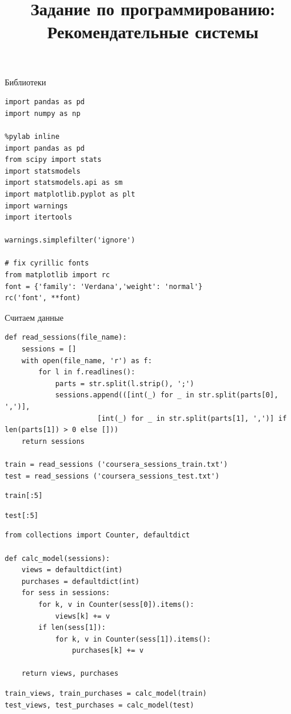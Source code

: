 \documentclass[11pt,a4paper]{article}
\title{Задание по программированию: Рекомендательные системы}
\begin{document}
\maketitle

Библиотеки

\begin{verbatim}
import pandas as pd
import numpy as np

%pylab inline
import pandas as pd
from scipy import stats
import statsmodels
import statsmodels.api as sm
import matplotlib.pyplot as plt
import warnings
import itertools

warnings.simplefilter('ignore')

# fix cyrillic fonts
from matplotlib import rc
font = {'family': 'Verdana','weight': 'normal'}
rc('font', **font)
\end{verbatim}

Считаем данные

\begin{verbatim}
def read_sessions(file_name):
    sessions = []
    with open(file_name, 'r') as f:
        for l in f.readlines():
            parts = str.split(l.strip(), ';')
            sessions.append(([int(_) for _ in str.split(parts[0], ',')], 
                      [int(_) for _ in str.split(parts[1], ',')] if len(parts[1]) > 0 else []))
    return sessions

train = read_sessions ('coursera_sessions_train.txt')
test = read_sessions ('coursera_sessions_test.txt')
\end{verbatim}

\begin{verbatim}
train[:5]
\end{verbatim}

\begin{verbatim}
test[:5]
\end{verbatim}

\begin{verbatim}
from collections import Counter, defaultdict

def calc_model(sessions):
    views = defaultdict(int)
    purchases = defaultdict(int)
    for sess in sessions:
        for k, v in Counter(sess[0]).items():
            views[k] += v
        if len(sess[1]):
            for k, v in Counter(sess[1]).items():
                purchases[k] += v

    return views, purchases
\end{verbatim}

\begin{verbatim}
train_views, train_purchases = calc_model(train)
test_views, test_purchases = calc_model(test)
\end{verbatim}
\end{document}
